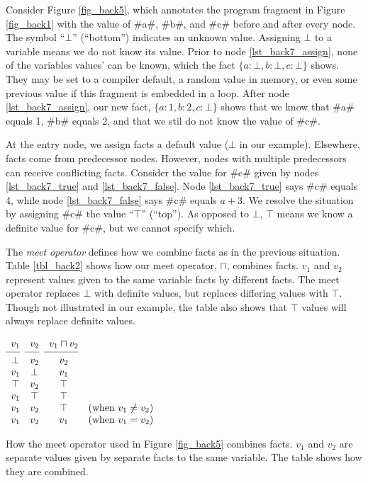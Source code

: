 \documentclass[12pt]{report}
\begin{document}
Consider Figure \ref{fig_back5}, which annotates the program fragment
in Figure \ref{fig_back1} with the value of #a#, #b#, and #c# before
and after every node. The symbol ``$\bot$'' (``bottom'') indicates an
unknown value. Assigning $\bot$ to a variable means we do not know its
value. Prior to node \ref{lst_back7_assign}, none of the variables
values' can be known, which the fact $\{a : \bot,b : \bot,c : \bot\}$
shows.  They may be set to a compiler default, a random value in
memory, or even some previous value if this fragment is embedded in a
loop. After node \ref{lst_back7_assign}, our new fact, $\{a : 1,b : 2,c : \bot\}$
shows that we know that #a# equals 1, #b# equals 2, and that we stil do not know
the value of #c#.

\afterpage{\clearpage\clearpage}

At the entry node, we assign \inE facts a default value ($\bot$
in our example). Elsewhere, \inE facts come from predecessor
nodes. However, nodes with multiple predecessors can receive
conflicting facts. Consider the value for #c# given by nodes
\ref{lst_back7_true} and \ref{lst_back7_false}. Node
\ref{lst_back7_true} says #c# equals 4, while node
\ref{lst_back7_false} says #c# equals $a + 3$. We resolve the
situation by assigning #c# the value ``$\top$'' (``top''). As opposed
to $\bot$, $\top$ means we know a definite value for #c#, but we
cannot specify which.

The \emph{meet operator} defines how we combine facts as in the
previous situation. Table \ref{tbl_back2} shows how our meet operator,
$\sqcap$, combines facts. $v_1$ and $v_2$ represent values given to
the same variable facts by different facts. The meet operator replaces
$\bot$ with definite values, but replaces differing values with
$\top$. Though not illustrated in our example, the table also shows
that $\top$ values will always replace definite values.

\begin{table}[tbh]
  \centering
  \figbegin
  \begin{math}
    \begin{array}{cccc}
      v_1 & v_2 & v_1 \sqcap v_2 \\
      \cmidrule(r){1-1}\cmidrule(r){2-2}\cmidrule(r){3-3}
      \bot & v_2 & v_2 & \\ 
      v_1 & \bot & v_1 & \\
      \top & v_2 & \top & \\
      v_1 & \top & \top  &\\
      v_1 & v_2 & \top & \text{(when $v_1 \neq v_2$)}\\
      v_1 & v_2 & v_1 & \text{(when $v_1 = v_2$)}
    \end{array}
  \end{math}
  \caption{How the meet operator used in
    Figure \ref{fig_back5} combines facts. $v_1$ and $v_2$ are
    separate values given by separate facts to the same variable. The
    table shows how they are combined.}
  \label{tbl_back2}
  \figend
\end{table}
\end{document}

